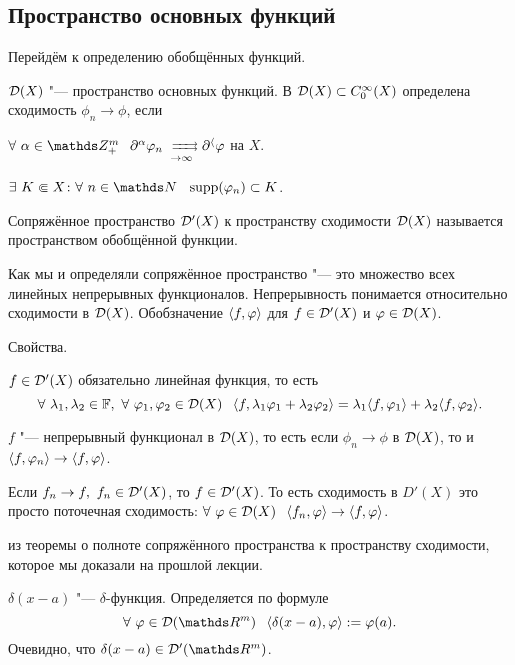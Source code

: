 \subsection{Пространство основных функций}
Перейдём к определению обобщённых функций.
\begin{Def}
  $\mathcal D(X)$ "--- пространство основных функций. В $\mathcal D(X)\subset C_0^\infty(X)$ определена сходимость $\phi_n\to\phi$, если
\begin{roItems}
  \item $\forall\ \alpha\in\Z_+^m\pau \dl^\alpha\phi_n\rsh[ ]{}\dl^\a\phi$ на $X$.
\item $\exists\ K\Subset X\colon \forall\ n\in\N\pau \supp(\phi_n)\subset K$.
\end{roItems}
\end{Def}

\begin{Def}
  Сопряжённое пространство $\mathcal D'(X)$ к пространству сходимости $\mathcal D(X)$ называется пространством обобщённой функции.
\end{Def}

Как мы и определяли сопряжённое пространство "--- это множество всех линейных непрерывных функционалов. Непрерывность понимается относительно сходимости в $\mathcal D(X)$. Обобзначение $\langle f,\varphi\rangle$ для $f\in \mathcal D'(X)$  и $\varphi\in\mathcal D(X)$.

Свойства.
\begin{roItems}
  \item $f\in\mathcal D'(X)$ обязательно линейная функция, то есть
\[
  \forall\ \l_1,\l_2\in\F,\ \forall\ \phi_1,\phi_2\in\D(X)\pau 
  \la f,\l_1\phi_1+\l_2\phi_2\ra =\l_1\la f,\phi_1\ra +\l_2\la f,\phi_2\ra.
\]
\item $f$ "--- непрерывный функционал в $\mathcal D(X)$, то есть если $\phi_n\to \phi$ в $\mathcal D(X)$, то и $\langle f,\varphi_n\rangle\rightarrow\langle f,\varphi\rangle$.
\item Если $f_n\rightarrow f,\ f_n\in\mathcal D'(X)$, то $f\in\mathcal D'(X)$. То есть сходимость в $D'(X)$ это просто поточечная сходимость: $\forall\ \phi\in\D(X)\pau \la f_n,\phi\ra\to \la f,\phi\ra$.

из теоремы о полноте сопряжённого пространства к пространству сходимости, которое мы доказали на прошлой лекции.
\end{roItems}

\begin{Exa}
 $\delta(x-a)$ "--- $\delta$-функция. Определяется по формуле
\[
  \forall\ \phi\in\D(\R^m)\pau \la\delta(x-a),\phi\ra:=\phi(a).
\]
Очевидно, что $\delta(x-a)\in\D'(\R^m)$.
\end{Exa}

